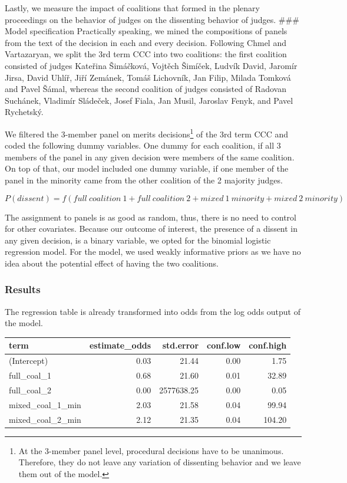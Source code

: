 \documentclass[
  11pt,
]{article}
\begin{document}
Lastly, we measure the impact of coalitions that formed in the plenary
proceedings on the behavior of judges on the dissenting behavior of
judges. \#\#\# Model specification Practically speaking, we mined the
compositions of panels from the text of the decision in each and every
decision. Following Chmel and Vartazaryan, we split the 3rd term CCC
into two coalitions: the first coalition consisted of judges Kateřina
Šimáčková, Vojtěch Šimíček, Ludvík David, Jaromír Jirsa, David Uhlíř,
Jiří Zemánek, Tomáš Lichovník, Jan Filip, Milada Tomková and Pavel
Šámal, whereas the second coalition of judges consisted of Radovan
Suchánek, Vladimír Sládeček, Josef Fiala, Jan Musil, Jaroslav Fenyk, and
Pavel Rychetský.

We filtered the 3-member panel on merits decisions\footnote{At the
  3-member panel level, procedural decisions have to be unanimous.
  Therefore, they do not leave any variation of dissenting behavior and
  we leave them out of the model.} of the 3rd term CCC and coded the
following dummy variables. One dummy for each coalition, if all 3
members of the panel in any given decision were members of the same
coalition. On top of that, our model included one dummy variable, if one
member of the panel in the minority came from the other coalition of the
2 majority judges.

\[
P(dissent) = f(full\:coalition\:1 + full\:coalition\:2 + mixed\:1\:minority + mixed\:2\:minority)
\]

The assignment to panels is as good as random, thus, there is no need to
control for other covariates. Because our outcome of interest, the
presence of a dissent in any given decision, is a binary variable, we
opted for the binomial logistic regression model. For the model, we used
weakly informative priors as we have no idea about the potential effect
of having the two coalitions.

\hypertarget{results-2}{%
\subsubsection{Results}\label{results-2}}

The regression table is already transformed into odds from the log odds
output of the model.

\begin{longtable}[]{@{}lrrrr@{}}
\toprule\noalign{}
term & estimate\_odds & std.error & conf.low & conf.high \\
\midrule\noalign{}
\endhead
\bottomrule\noalign{}
\endlastfoot
(Intercept) & 0.03 & 21.44 & 0.00 & 1.75 \\
full\_coal\_1 & 0.68 & 21.60 & 0.01 & 32.89 \\
full\_coal\_2 & 0.00 & 2577638.25 & 0.00 & 0.05 \\
mixed\_coal\_1\_min & 2.03 & 21.58 & 0.04 & 99.94 \\
mixed\_coal\_2\_min & 2.12 & 21.35 & 0.04 & 104.20 \\
\end{longtable}
\end{document}

